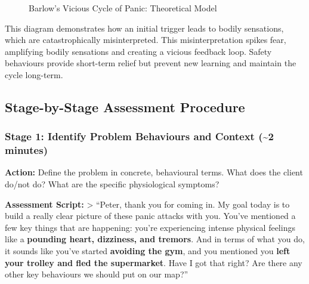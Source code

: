 \documentclass[
  american,
  letterpaper,
  DIV=11,
  numbers=noendperiod]{scrartcl}
\begin{document}
\begin{figure}[H]
\caption{Barlow's Vicious Cycle of Panic: Theoretical Model}
\end{figure}

This diagram demonstrates how an initial trigger leads to bodily
sensations, which are catastrophically misinterpreted. This
misinterpretation spikes fear, amplifying bodily sensations and creating
a vicious feedback loop. Safety behaviours provide short-term relief but
prevent new learning and maintain the cycle long-term.

\subsection{Stage-by-Stage Assessment
Procedure}\label{stage-by-stage-assessment-procedure}

\subsubsection{Stage 1: Identify Problem Behaviours and Context
(\textasciitilde2
minutes)}\label{stage-1-identify-problem-behaviours-and-context-2-minutes}

\textbf{Action:} Define the problem in concrete, behavioural terms. What
does the client do/not do? What are the specific physiological symptoms?

\textbf{Assessment Script:} \textgreater{} ``Peter, thank you for coming
in. My goal today is to build a really clear picture of these panic
attacks with you. You've mentioned a few key things that are happening:
you're experiencing intense physical feelings like a \textbf{pounding
heart, dizziness, and tremors}. And in terms of what you do, it sounds
like you've started \textbf{avoiding the gym}, and you mentioned you
\textbf{left your trolley and fled the supermarket}. Have I got that
right? Are there any other key behaviours we should put on our map?''
\end{document}
